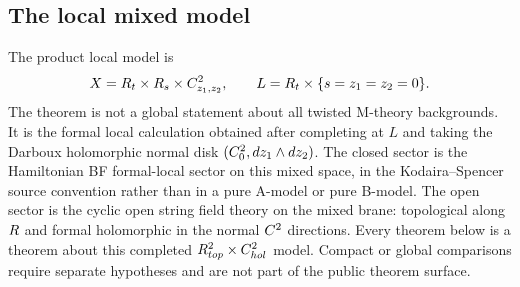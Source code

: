 \documentclass[11pt]{memoir}
\begin{document}
\subsection{The local mixed model}

The product local model is
\[
  X=R_t\times R_s\times C^2_{z_1,z_2},
  \qquad
  L=R_t\times\{s=z_1=z_2=0\}.
\]
The theorem is not a global statement about all twisted M-theory
backgrounds. It is the formal local calculation obtained after completing
at \(L\) and taking the Darboux holomorphic normal disk
\((C^2_0,dz_1\wedge dz_2)\).
The closed sector is the Hamiltonian BF formal-local sector on this mixed
space, in the Kodaira--Spencer source convention rather than in a pure
A-model or pure B-model. The open sector is the
cyclic open string field theory on the mixed brane: topological along $R$
and formal holomorphic in the normal $C^2$ directions.
Every theorem below is a theorem about this completed
\(R^2_{top}\times C^2_{hol}\) model.  Compact or
global comparisons require separate hypotheses and are not part of the
public theorem surface.
\end{document}
